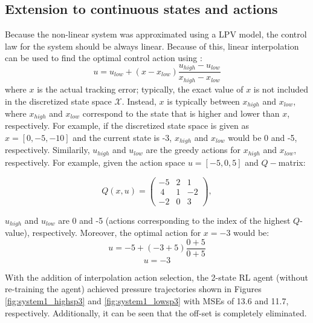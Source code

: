 \subsection{Extension to continuous states and actions}
Because the non-linear system was approximated using a LPV model, the control law for the system should be always linear. Because of this, linear interpolation can be used to find the optimal control action using \cite{interpolation}:
\begin{equation}
    u = u_{low} + (x - x_{low})\frac{u_{high} - u_{low}}{x_{high} - x_{low}}
    \label{eq:interpolation}
\end{equation}
where $x$ is the actual tracking error; typically, the exact value of $x$ is not included in the discretized state space $\mathcal{X}$.  Instead, $x$ is typically between $x_{high}$ and $x_{low}$, where $x_{high}$ and $x_{low}$ correspond to the state that is higher and lower than $x$, respectively.  For example, if the discretized state space is given as $x = [0, -5, -10]$ and the current state is -3, $x_{high}$ and $x_{low}$ would be 0 and -5, respectively.  Similarily, $u_{high}$ and $u_{low}$ are the greedy actions for $x_{high}$ and $x_{low}$, respectively. For example, given the action space $u=[-5, 0, 5]$ and $Q-$matrix:

    $$ Q(x, u) = \left(\begin{matrix}   -5  &  2  & 1 \\\
                                        4 & 1 & -2 \\
                                        -2 & 0 & 3 \end{matrix}\right), $$
                                        
$u_{high}$ and $u_{low}$ are 0 and -5 (actions corresponding to the index of the highest $Q$-value), respectively. Moreover, the optimal action for $x = -3$ would be:
$$u = -5 + (-3 + 5) \frac{0 + 5}{0 + 5}$$
$$u = -3$$

With the addition of interpolation action selection, the 2-state RL agent (without re-training the agent) achieved pressure trajectories shown in Figures \ref{fig:system1_highsp3} and \ref{fig:system1_lowsp3} with MSEs of 13.6 and 11.7, respectively. Additionally, it can be seen that the off-set is completely eliminated.

